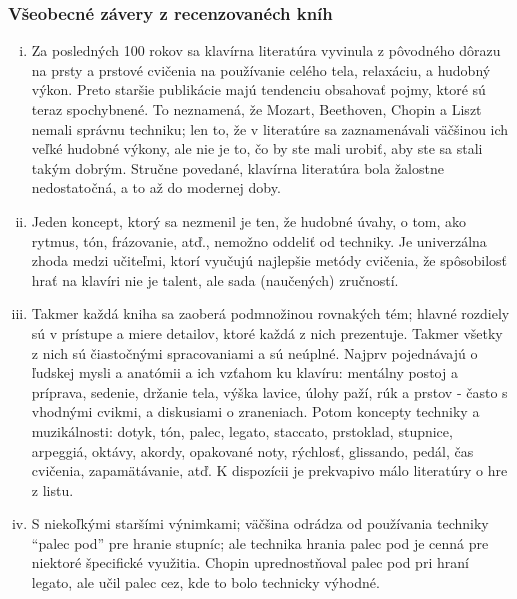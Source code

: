\subsubsection*{Všeobecné závery z recenzovanéch kníh}
\begin{enumerate}[(i)]
\item Za posledných 100 rokov sa klavírna literatúra vyvinula z pôvodného dôrazu na prsty a prstové cvičenia na používanie celého tela, relaxáciu, a hudobný výkon. Preto staršie publikácie majú tendenciu obsahovať pojmy, ktoré sú teraz spochybnené. To neznamená, že Mozart, Beethoven, Chopin a Liszt nemali správnu techniku; len to, že v literatúre sa zaznamenávali väčšinou ich veľké hudobné výkony, ale nie je to, čo by ste mali urobiť, aby ste sa stali takým dobrým. Stručne povedané, klavírna literatúra bola žalostne nedostatočná, a to až do modernej doby. 

\item Jeden koncept, ktorý sa nezmenil je ten, že hudobné úvahy, o tom, ako rytmus, tón, frázovanie, atď., nemožno oddeliť od techniky. Je univerzálna zhoda medzi učiteľmi, ktorí vyučujú najlepšie metódy cvičenia, že spôsobilosť hrať na klavíri nie je talent, ale sada (naučených) zručností. 

\item Takmer každá kniha sa zaoberá podmnožinou rovnakých tém; hlavné rozdiely sú v prístupe a miere detailov, ktoré každá z nich prezentuje. Takmer všetky z nich sú čiastočnými spracovaniami a sú  neúplné. Najprv pojednávajú o ľudskej mysli a anatómii a ich vzťahom ku klavíru: mentálny postoj a príprava, sedenie, držanie tela, výška lavice, úlohy paží, rúk a prstov - často s vhodnými cvikmi, a diskusiami o zraneniach. Potom koncepty techniky a muzikálnosti: dotyk, tón, palec, legato, staccato, prstoklad, stupnice, arpeggiá, oktávy, akordy, opakované noty, rýchlosť, glissando, pedál, čas cvičenia, zapamätávanie, atď. K dispozícii je prekvapivo málo literatúry o hre z listu. 

\item S niekoľkými staršími výnimkami; väčšina odrádza od používania techniky “palec pod” pre hranie stupníc; ale technika hrania palec pod je cenná pre niektoré špecifické využitia. Chopin uprednostňoval palec pod pri hraní legato, ale učil palec cez, kde to bolo technicky výhodné. 


\end{enumerate}
